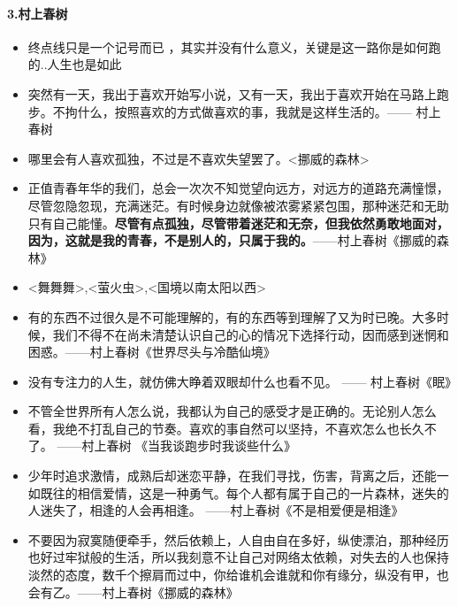 \documentclass[UTF8,a4paper,8pt]{ctexart}
\begin{document}
 \paragraph{3.村上春树}
 \begin{itemize}
 	\item 终点线只是一个记号而已 ，其实并没有什么意义，关键是这一路你是如何跑的..人生也是如此
 	
 	\item 突然有一天，我出于喜欢开始写小说，又有一天，我出于喜欢开始在马路上跑步。不拘什么，按照喜欢的方式做喜欢的事，我就是这样生活的。—— 村上春树
 	
 	\item 哪里会有人喜欢孤独，不过是不喜欢失望罢了。<挪威的森林>
 	
 	\item 正值青春年华的我们，总会一次次不知觉望向远方，对远方的道路充满憧憬，尽管忽隐忽现，充满迷茫。有时候身边就像被浓雾紧紧包围，那种迷茫和无助只有自己能懂。\textbf{尽管有点孤独，尽管带着迷茫和无奈，但我依然勇敢地面对，因为，这就是我的青春，不是别人的，只属于我的。}——村上春树《挪威的森林》
 	
 	\item <舞舞舞>,<萤火虫>,<国境以南太阳以西>
 	
 	\item 有的东西不过很久是不可能理解的，有的东西等到理解了又为时已晚。大多时候，我们不得不在尚未清楚认识自己的心的情况下选择行动，因而感到迷惘和困惑。——村上春树《世界尽头与冷酷仙境》
 	
 	\item 没有专注力的人生，就仿佛大睁着双眼却什么也看不见。 —— 村上春树《眠》
 	
 	\item 不管全世界所有人怎么说，我都认为自己的感受才是正确的。无论别人怎么看，我绝不打乱自己的节奏。喜欢的事自然可以坚持，不喜欢怎么也长久不了。	——村上春树 《当我谈跑步时我谈些什么》
 	
 	\item 少年时追求激情，成熟后却迷恋平静，在我们寻找，伤害，背离之后，还能一如既往的相信爱情，这是一种勇气。每个人都有属于自己的一片森林，迷失的人迷失了，相逢的人会再相逢。 ——村上春树《不是相爱便是相逢》
 	
 	\item 不要因为寂寞随便牵手，然后依赖上，人自由自在多好，纵使漂泊，那种经历也好过牢狱般的生活，所以我刻意不让自己对网络太依赖，对失去的人也保持淡然的态度，数千个擦肩而过中，你给谁机会谁就和你有缘分，纵没有甲，也会有乙。——村上春树《挪威的森林》
 \end{itemize}   
 
\end{document}
